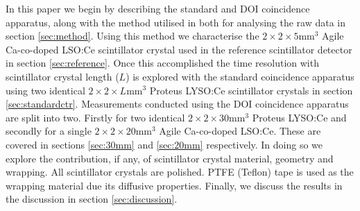 In this paper we begin by describing the standard and DOI coincidence apparatus, along with the method utilised in both for analysing the raw data in section \ref{sec:method}. Using this method we characterise the $2\times2\times5$mm$^3$ Agile Ca-co-doped LSO:Ce scintillator crystal used in the reference scintillator detector in section \ref{sec:reference}. Once this accomplished the time resolution with scintillator crystal length ($L$) is explored with the standard coincidence apparatus using two identical $2\times2\times L$mm$^3$ Proteus LYSO:Ce scintillator crystals in section \ref{sec:standardctr}. Measurements conducted using the DOI coincidence apparatus are split into two. Firstly for two identical $2\times2\times30$mm$^3$ Proteus LYSO:Ce and secondly for a single $2\times2\times20$mm$^3$ Agile Ca-co-doped LSO:Ce. These are covered in sections \ref{sec:30mm} and \ref{sec:20mm} respectively. In doing so we explore the contribution, if any, of scintillator crystal material, geometry and wrapping. All scintillator crystals are polished. PTFE (Teflon) tape is used as the wrapping material due its diffusive properties. Finally, we discuss the results in the discussion in section \ref{sec:discussion}.
